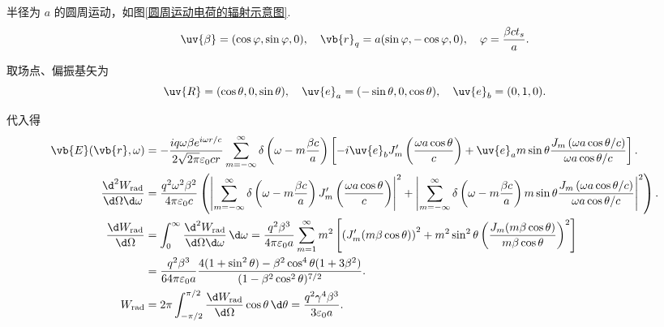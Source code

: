 \begin{example}
	半径为 \(a\) 的圆周运动，如图\ref{圆周运动电荷的辐射示意图}.
	\begin{equation*}
		\uv{\beta} = (\cos\varphi, \sin\varphi, 0), \quad \vb{r}_{q} = a (\sin\varphi, -\cos\varphi, 0), \quad \varphi = \frac{\beta c t_{s}}{a}.
	\end{equation*}

	取场点、偏振基矢为
	\begin{equation*}
		\uv{R} = (\cos\theta, 0, \sin\theta), \quad \uv{e}_{a} = (-\sin\theta, 0, \cos\theta), \quad \uv{e}_{b} = (0, 1, 0).
	\end{equation*}

	代入得
	\begin{align*}
		\vb{E}(\vb{r}, \omega) &= -\frac{i q \omega \beta e^{i\omega r/c}}{2\sqrt{2\pi} \varepsilon_{0} c r} \sum_{m=-\infty}^{\infty} \delta\left( \omega - m \frac{\beta c}{a} \right) \left[ -i \uv{e}_{b} J_{m}'\left( \frac{\omega a \cos\theta}{c} \right) + \uv{e}_{a} m \sin\theta \frac{J_{m}\left( \omega a \cos\theta/c \right)}{\omega a \cos\theta/c} \right]. \\
		\frac{\d^{2} W_{\mathrm{rad}}}{\d \Omega \d \omega} &= \frac{q^{2} \omega^{2} \beta^{2}}{4\pi \varepsilon_{0} c} \left( \left| \sum_{m=-\infty}^{\infty} \delta\left( \omega - m \frac{\beta c}{a} \right) J_{m}'\left( \frac{\omega a \cos\theta}{c} \right) \right|^{2} + \left| \sum_{m=-\infty}^{\infty} \delta\left( \omega - m \frac{\beta c}{a} \right) m \sin\theta \frac{J_{m}\left(\omega a \cos\theta/c \right)}{\omega a \cos\theta/c} \right|^{2} \right). \\
		\frac{\d  W_{\mathrm{rad}}}{\d \Omega} &= \int_{0}^{\infty} \frac{\d^{2} W_{\mathrm{rad}}}{\d \Omega \d \omega} \, \d \omega = \frac{q^{2} \beta^{3}}{4\pi \varepsilon_{0} a} \sum_{m=1}^{\infty} m^{2} \left[ \left( J_{m}'(m\beta \cos\theta) \right)^{2} + m^{2} \sin^{2}\theta \left( \frac{J_{m}(m\beta \cos\theta)}{m\beta \cos\theta} \right)^{2} \right] \\
		&= \frac{q^{2} \beta^{3}}{64\pi \varepsilon_{0} a} \frac{4(1 + \sin^{2}\theta) - \beta^{2} \cos^{4}\theta (1 + 3\beta^{2})}{(1 - \beta^{2} \cos^{2}\theta)^{7/2}}. \\
		W_{\mathrm{rad}} &= 2\pi \int_{-\pi/2}^{\pi/2} \frac{\d  W_{\mathrm{rad}}}{\d \Omega} \cos\theta \, \d \theta = \frac{q^{2} \gamma^{4} \beta^{3}}{3 \varepsilon_{0} a}.
	\end{align*}


\end{example}
